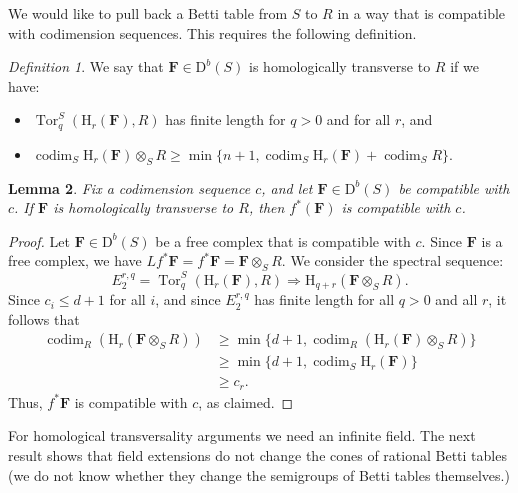 \documentclass[12pt]{amsart}
\newtheorem{lemma}{Lemma}[section]
\theoremstyle{definition}
\theoremstyle{remark}
\newtheorem{defn}[lemma]{Definition}
\newcommand{\Tor}{\operatorname{Tor}}
\newcommand{\codim}{\operatorname{codim}}
\newcommand{\HH}{\mathrm{H}}
\newcommand{\cc}{c}
\newcommand{\FF}{\mathbf{F}}
\newcommand{\defi}[1]{\textsf{#1}} %
\newcommand{\DD}{\mathrm{D}}
\newcommand{\david}[1]{{\color{red} \sf $\clubsuit\clubsuit\clubsuit$ David: [#1]}}
\begin{document}
We would like to pull back a Betti table from $S$ to $R$ in a way that is compatible with codimension sequences.  This requires the following definition.

\begin{defn}
We say that $\FF\in \DD^b(S)$ \defi{ is homologically transverse to $R$} if we have:
\begin{itemize}
	\item $\Tor^S_q(\HH_r(\FF),R)$ has finite length for $q>0$ and for all $r$, and
	\item $\codim_S \HH_r(\FF)\otimes_S R\geq \min\{n+1, \codim_S \HH_r({\FF})+\codim_S R\}.$
\end{itemize}
\end{defn}




 \begin{lemma}\label{lem:pushpull}
Fix a codimension sequence $\cc$, and let $\FF\in \DD^b(S)$ be compatible with $\cc$.  If $\FF$ is homologically transverse to $R$, then $f^*(\FF)$ is compatible with $\cc$.
\end{lemma}
\begin{proof}
Let $\FF\in \DD^b(S)$ be a free complex that is compatible with $\cc$.  
Since $\FF$ is a free complex, we have $Lf^*\FF=f^*\FF=\FF\otimes_S R$.   We  consider the spectral sequence:
\[
E^{r,q}_2=\Tor^S_{q}(\HH_r(\FF),R)\Rightarrow \HH_{q+r}(\FF\otimes_S R).
\]
Since $c_i\leq d+1$ for all $i$, and since $E^{r,q}_2$ has finite length for all $q>0$ and all $r$, it follows that
\begin{align*}
\codim_R \left(\HH_{r}(\FF\otimes_S R)\right) &\geq \min\{d+1, \codim_R\left( \HH_r(\FF)\otimes_S R\right)\} \\
&\geq \min\{d+1, \codim_S \HH_r(\FF)\}\\
& \geq c_r.
\end{align*}
Thus, $f^*\FF$ is compatible with $\cc$, as claimed.
\end{proof}

For homological transversality arguments we need an infinite field. The next result shows that
field extensions do not change the cones of rational Betti tables (we do not know whether they change the semigroups of Betti tables themselves.)%
\end{document}

